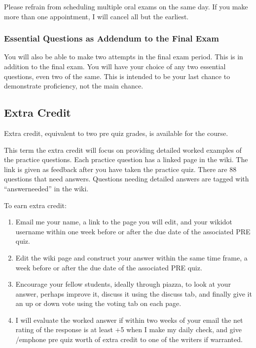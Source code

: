 \documentclass[letterpaper,10pt]{article}
\newif\ifonline
\begin{document}
  Please refrain from scheduling multiple oral exams on the same day.  If you make more than one appointment, I will cancel all but the earliest.
  
  \subsubsection{ Essential Questions as Addendum to the Final Exam}
  You will also be able to make two attempts in the final exam period. This is in addition to the final exam. You will have your choice of any two essential questions, even two of the same. This is intended to be your last chance to demonstrate proficiency, not the main chance.

\fi

\ifonline

\else
\subsection{Extra Credit}\label{sec:ExtraCredit}
Extra credit, equivalent to two pre quiz grades, is available for the
course.  

This term the extra credit will focus on providing detailed worked examples of the practice questions.  Each practice question has a linked page in the wiki.  The link is given as feedback after you have taken the practice quiz.  There are 88 questions that need answers.  Questions needing detailed answers are tagged with ``answerneeded'' in the wiki.

To earn extra credit:
\begin{enumerate}
    
    \item Email me your name, a link to the page you will edit, and your wikidot username within one week before or after the due date of the associated PRE quiz. 
    
    \item Edit the wiki page and construct your answer within the same time frame, a week before or after the due date of the associated PRE quiz.
    
    \item Encourage your fellow students, ideally through piazza, to look at your answer, perhaps improve it, discuss it using the discuss tab, and finally give it an up or down vote using the voting tab on each page.  
    
    \item I will evaluate the worked answer if within two weeks of your email the net rating of the response is at least +5 when I make my daily check, and give /emph{one pre quiz worth of extra credit} to one of the writers if warranted.

\end{enumerate}
\end{document}
